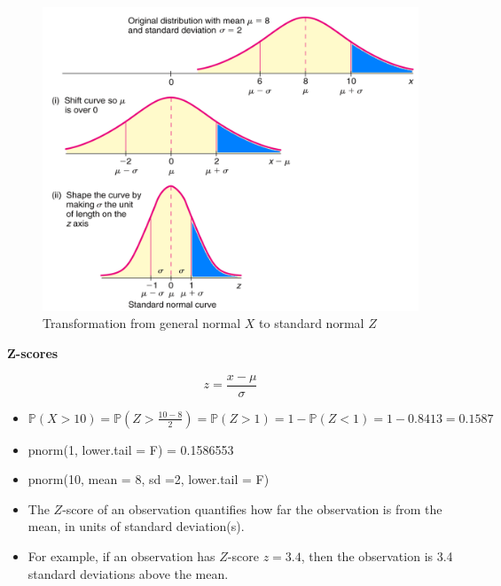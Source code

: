 \documentclass[12pt]{amsart}
\newcommand{\m}{\mu}
\newcommand{\s}{\sigma}
\newcommand{\bP}{\mathbb{P}}
\begin{document}
{%
\begin{figure}[h!]
  \includegraphics[width=5in]{img/X_to_Z_transformation_Brase.png}
  \caption{Transformation from general normal $X$ to standard normal $Z$}
\end{figure}


\textbf{Z-scores} \newline

\color{blue}
$$z = \frac{x-\m}{\s}$$

\begin{itemize}
\item $\bP( X > 10 ) = \bP( Z >  \frac{10-8}{2}) = \bP( Z >  1) = 1 - \bP( Z <  1) = 1- 0.8413 = 0.1587$
\item pnorm(1, lower.tail = F) = 0.1586553
\item pnorm(10, mean = 8, sd =2, lower.tail = F)
\end{itemize}

\color{black}

\vfill 

\begin{itemize}
\item The $Z$-score of an observation quantifies how far the observation is from the mean, in units of standard deviation(s). 
\item For example, if an observation has $Z$-score $z = 3.4$, then the observation is 3.4 standard deviations above the mean.
\end{itemize}



}
\end{document}
